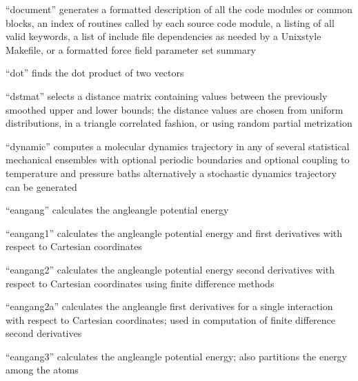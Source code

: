 \documentclass[letterpaper,11pt,english]{sphinxmanual}
\begin{document}

“document” generates a formatted description of all the code modules or common blocks, an index of routines called by each source code module, a listing of all valid keywords, a list of include file dependencies as needed by a Unix\sphinxhyphen{}style Makefile, or a formatted force field parameter set summary


“dot” finds the dot product of two vectors


“dstmat” selects a distance matrix containing values between the previously smoothed upper and lower bounds; the distance values are chosen from uniform distributions, in a triangle correlated fashion, or using random partial metrization


“dynamic” computes a molecular dynamics trajectory in any of several statistical mechanical ensembles with optional periodic boundaries and optional coupling to temperature and pressure baths alternatively a stochastic dynamics trajectory can be generated


“eangang” calculates the angle\sphinxhyphen{}angle potential energy


“eangang1” calculates the angle\sphinxhyphen{}angle potential energy and first derivatives with respect to Cartesian coordinates


“eangang2” calculates the angle\sphinxhyphen{}angle potential energy second derivatives with respect to Cartesian coordinates using finite difference methods


“eangang2a” calculates the angle\sphinxhyphen{}angle first derivatives for a single interaction with respect to Cartesian coordinates; used in computation of finite difference second derivatives


“eangang3” calculates the angle\sphinxhyphen{}angle potential energy; also partitions the energy among the atoms

\end{document}
